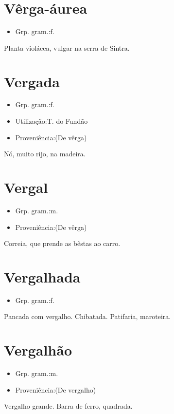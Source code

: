 \documentclass{article}
\begin{document}
\section{Vêrga-áurea}
\begin{itemize}
\item {Grp. gram.:f.}
\end{itemize}
Planta violácea, vulgar na serra de Sintra.
\section{Vergada}
\begin{itemize}
\item {Grp. gram.:f.}
\end{itemize}
\begin{itemize}
\item {Utilização:T. do Fundão}
\end{itemize}
\begin{itemize}
\item {Proveniência:(De \textunderscore vêrga\textunderscore )}
\end{itemize}
Nó, muito rijo, na madeira.
\section{Vergal}
\begin{itemize}
\item {Grp. gram.:m.}
\end{itemize}
\begin{itemize}
\item {Proveniência:(De \textunderscore vêrga\textunderscore )}
\end{itemize}
Correia, que prende as bêstas ao carro.
\section{Vergalhada}
\begin{itemize}
\item {Grp. gram.:f.}
\end{itemize}
Pancada com vergalho.
Chibatada.
Patifaria, maroteira.
\section{Vergalhão}
\begin{itemize}
\item {Grp. gram.:m.}
\end{itemize}
\begin{itemize}
\item {Proveniência:(De \textunderscore vergalho\textunderscore )}
\end{itemize}
Vergalho grande.
Barra de ferro, quadrada.
\end{document}
